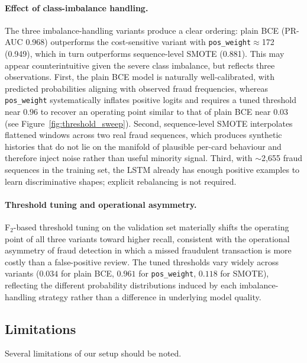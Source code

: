 \documentclass[oneside,12pt,parskip=half,american,numbers=noenddot]{scrreprt}
\begin{document}
\paragraph{Effect of class-imbalance handling.}
The three imbalance-handling variants produce a clear ordering: plain 
BCE (PR-AUC 0.968) outperforms the cost-sensitive variant with 
\texttt{pos\_weight}$\approx$172 (0.949), which in turn outperforms 
sequence-level SMOTE (0.881). This may appear counterintuitive given 
the severe class imbalance, but reflects three observations. First, 
the plain BCE model is naturally well-calibrated, with predicted 
probabilities aligning with observed fraud frequencies, whereas 
\texttt{pos\_weight} systematically inflates positive logits and 
requires a tuned threshold near $0.96$ to recover an operating point 
similar to that of plain BCE near $0.03$ (see 
Figure~\ref{fig:threshold_sweep}). Second, sequence-level SMOTE 
interpolates flattened windows across two real fraud sequences, which 
produces synthetic histories that do not lie on the manifold of 
plausible per-card behaviour and therefore inject noise rather than 
useful minority signal. Third, with $\sim$2{,}655 fraud sequences in 
the training set, the LSTM already has enough positive examples to 
learn discriminative shapes; explicit rebalancing is not required.

\paragraph{Threshold tuning and operational asymmetry.}
F$_2$-based threshold tuning on the validation set materially shifts 
the operating point of all three variants toward higher recall, 
consistent with the operational asymmetry of fraud detection in which 
a missed fraudulent transaction is more costly than a false-positive 
review. The tuned thresholds vary widely across variants ($0.034$ for 
plain BCE, $0.961$ for \texttt{pos\_weight}, $0.118$ for SMOTE), 
reflecting the different probability distributions induced by each 
imbalance-handling strategy rather than a difference in underlying 
model quality.


\subsection{Limitations}

Several limitations of our setup should be noted.
\end{document}
